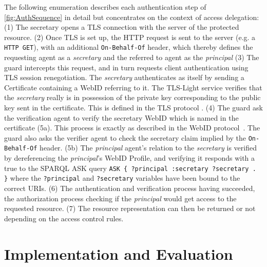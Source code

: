 \documentclass[a4paper]{llncs}
\begin{document}
The following enumeration describes each authentication step of \autoref{fig:AuthSequence} in detail but concentrates on the context of access delegation:
(1) The secretary  opens a TLS connection with the server of the protected resource.
(2) Once TLS is set up, the HTTP request is sent to the server (e.g. a \verb!HTTP GET!), with an additional \lstinline|On-Behalf-Of| header, which thereby defines the requesting agent as a \textit{secretary} and the referred to agent as the \textit{principal} 
(3) The guard intercepts this request, and  in turn requests client authentication using TLS session renegotiation.
The \textit{secretary} authenticates as itself by sending a Certificate containing a WebID referring to it.
The TLS-Light service verifies that the \textit{secretary} really is in possession of the private key corresponding to the public key sent in the certificate.
This is defined in the TLS protocol \cite{dierks-t-2012--a}.
(4) The guard ask the verification agent to verify the secretary WebID which is named in the certificate (5a).
This process is exactly as described in the WebID protocol~\cite{story-h-2009--a}.
The guard also asks the verifier agent to check the secretary claim implied by the \lstinline|On-Behalf-Of| header.
(5b) The \textit{principal} agent's relation to the \textit{secretary} is  verified by dereferencing the \textit{principal}'s WebID Profile, and verifying it responds with a true to the SPARQL ASK query \lstinline|ASK { ?principal :secretary ?secretary . }| where the \lstinline|?principal| and \lstinline|?secretary| variables have been bound to the correct URIs.
(6) The authentication and verification process having succeeded, the authorization process checking if the \textit{principal} would get access to the requested resource.
(7) The resource representation can then be returned or not depending on the access control rules.


\section{Implementation and Evaluation}\label{sec:eval}
\end{document}
